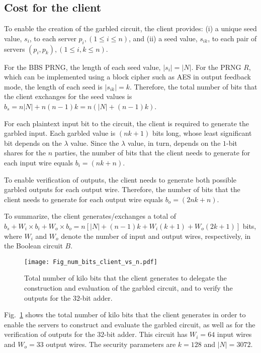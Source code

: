 \documentclass[10pt,journal,cspaper,compsoc]{IEEEtran}
\begin{document}
\subsection{Cost for the client}
\label{sec_cost_for_client}
To enable the creation of the garbled circuit, the client provides: (i) a unique seed value, $s_i$, to each server $p_i, (1\le i\le n)$, and (ii) a seed value, $s_{ik}$, to each pair of servers $(p_i,p_k),(1\le i,k\le n)$.


For the BBS PRNG, the length of each seed value, $|s_i|=|N|$. For the PRNG $R$, which can be implemented using a block cipher such as AES in output feedback mode, the length of each seed is $|s_{ik}|=k$. Therefore, the total number of bits that the client exchanges for the seed values is $b_s=n|N|+n(n-1)k=n(|N|+(n-1)k)$.



For each plaintext input bit to the circuit, the client is required to generate the garbled input. Each garbled value is $(nk+1)$ bits long, whose least significant bit depends on the $\lambda$ value. Since the $\lambda$ value, in turn, depends on the $1$-bit shares for the $n$ parties, the number of bits that the client needs to generate for each input wire equals $b_i=(nk+n)$.


To enable verification of outputs, the client needs to generate both possible garbled outputs for each output wire. Therefore, the number of bits that the client needs to generate for each output wire equals $b_o=(2nk+n)$.


To summarize, the client generates/exchanges a total of $b_s+W_i\times b_i+W_o\times b_o=n[|N|+(n-1)k+W_i(k+1)+W_o(2k+1)]$ bits, where $W_i$ and $W_o$ denote the number of input and output wires, respectively, in the Boolean circuit $B$.

\begin{figure}[t]
\centering
\texttt{[image: Fig\_num\_bits\_client\_vs\_n.pdf]}
\vspace{-3 mm}
\caption{Total number of kilo bits that the client generates to delegate the construction and evaluation of the garbled circuit, and to verify the outputs for the $32$-bit adder.\vspace{-3 mm}}
\label{fig_num_bits_client}
\end{figure}


Fig.~\ref{fig_num_bits_client} shows the total number of kilo bits that the client generates in order to enable the servers to construct and evaluate the garbled circuit, as well as for the verification of outputs for the $32$-bit adder. This circuit has $W_i=64$ input wires and $W_o=33$ output wires. The security parameters are $k=128$ and $|N|=3072$.
\end{document}
